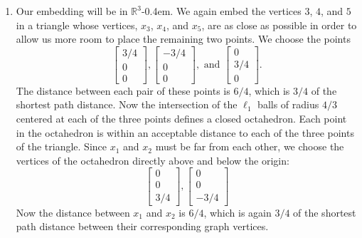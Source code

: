 \documentclass{article}
\newcommand{\R}{\mathbb{R}}
\newcommand{\1}{\mathbf{1}}
\newcommand{\0}{\mathbf{0}}
\begin{document}
\begin{enumerate}
\begin{enumerate}
  \item
    Our embedding will be in $\R^3$\kern-0.4em.
    We again embed the vertices $3$, $4$, and $5$ in a triangle whose vertices, $x_3$, $x_4$, and $x_5$, are as close as possible in order to allow us more room to place the remaining two points.
    We choose the points
    \begin{equation*}
      \begin{bmatrix}
        3/4 \\ 0 \\ 0
      \end{bmatrix},
      \begin{bmatrix}
        -3/4 \\ 0 \\ 0
      \end{bmatrix}, \text{ and }
      \begin{bmatrix}
        0 \\ 3/4 \\ 0
      \end{bmatrix}.
    \end{equation*}
    The distance between each pair of these points is $6/4$, which is $3 / 4$ of the shortest path distance.
    Now the intersection of the $\ell_1$ balls of radius $4/3$ centered at each of the three points defines a closed octahedron.
    Each point in the octahedron is within an acceptable distance to each of the three points of the triangle.
    Since $x_1$ and $x_2$ must be far from each other, we choose the vertices of the octahedron directly above and below the origin:
    \begin{equation*}
      \begin{bmatrix}
        0 \\ 0 \\ 3/4
      \end{bmatrix},
      \begin{bmatrix}
        0 \\ 0 \\ -3/4
      \end{bmatrix}
    \end{equation*}
    Now the distance between $x_1$ and $x_2$ is $6/4$, which is again $3/4$ of the shortest path distance between their corresponding graph vertices.
  \end{enumerate}
\end{enumerate}

\printbibliography
\end{document}
